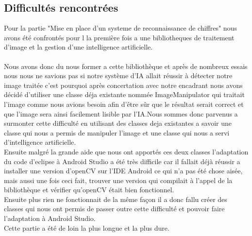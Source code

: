 \documentclass{article}
\begin{document}
\subsection{Difficultés rencontrées}
Pour la partie "Mise en place d'un systeme de reconnaissance de chiffres" nous avons été confrontés pour l la première fois a une bibliotheques de traitement d'image et la gestion d'une intelligence artificielle.\\\\
Nous avons donc du nous former a cette bibliothèque et après de nombreux essais nous nous ne savions pas si notre système d'IA allait réussir à détecter notre image traitée c'est pourquoi après concertation avec notre encadrant nous avons décidé d'utiliser une classe déja existante nommée ImageManipulator qui traitait l'image comme nous avions besoin afin d'être sûr que le résultat serait correct et que l'image sera ainsi facilement lisible par l'IA.Nous sommes donc parvenus a surmonter cette difficulté en utilisant des classes deja existantes a savoir une classe qui nous a permis de manipuler l'image et une classe qui nous a servi d'intelligence artificielle.\\

Ensuite malgré la grande aide que nous ont apportés ces deux classes l'adaptation du code d'eclipse à Android Studio a été très difficile car il fallait déjà réussir a installer une version d'openCV sur l'IDE Android ce qui n'a pas été chose aisée, mais aussi une fois ceci fait, trouver une version qui compilait à l'appel de la bibliothèque et vérifier qu'openCV était bien fonctionnel.\\
Ensuite plus rien ne fonctionnait de la même façon il a donc fallu créer des classes qui nous ont permis de passer outre cette difficulté et pouvoir faire l'adaptation à Android Studio.\\

Cette partie a été de loin la plus longue et la plus dure.
\end{document}
